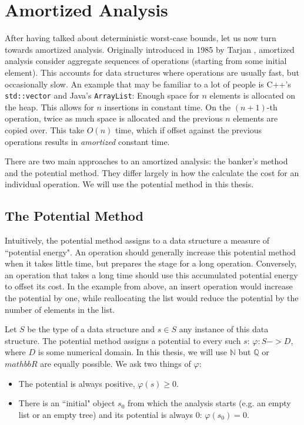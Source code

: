 
\chapter{Amortized Analysis}
After having talked about deterministic worst-case bounds, let us now turn towards amortized analysis. Originally introduced in 1985 by Tarjan \cite{tarjan:1985:amortizedcc}, amortized analysis consider aggregate sequences of operations (starting from some initial element). This accounts for data structures where operations are usually fast, but occasionally slow. An example that may be familiar to a lot of people is C++'s \texttt{std::vector} and Java's \texttt{ArrayList}: Enough space for $n$ elements is allocated on the heap. This allows for $n$ insertions in constant time. On the $(n+1)$-th operation, twice as much space is allocated and the previous $n$ elements are copied over. This take $O(n)$ time, which if offset against the previous operations results in \emph{amortized} constant time.

There are two main approaches to an amortized analysis: the banker's method and the potential method. They differ largely in how the calculate the cost for an individual operation. We will use the potential method in this thesis.

\section{The Potential Method}
Intuitively, the potential method assigns to a data structure a measure of ``potential energy". An operation should generally increase this potential method when it takes little time, but prepares the stage for a long operation. Conversely, an operation that takes a long time should use this accumulated potential energy to offset its cost. In the example from above, an insert operation would increase the potential by one, while reallocating the list would reduce the potential by the number of elements in the list.

Let $S$ be the type of a data structure and $s \in S$ any instance of this data structure. The potential method assigns a potential to every such $s$: $\varphi : S -> D$, where $D$ is some numerical domain. In this thesis, we will use $\mathbb N$ but $\mathbb Q$ or $mathbb R$ are equally possible. We ask two things of $\varphi$:

\begin{itemize}
    \item The potential is always positive, $\varphi(s) \geq 0$.
    \item There is an ``initial" object $s_0$ from which the analysis starts (e.g. an empty list or an empty tree) and its potential is always 0: $\varphi(s_0) = 0$.
\end{itemize}

